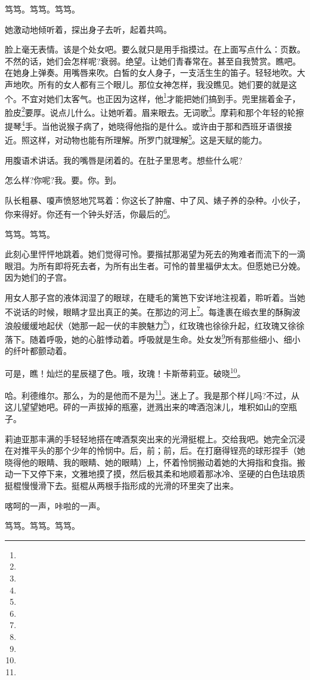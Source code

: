 \par 笃笃。笃笃。笃笃。
\par 她激动地倾听着，探出身子去听，起着共鸣。
\par 脸上毫无表情。该是个处女吧。要么就只是用手指摸过。在上面写点什么：页数。不然的话，她们会怎样呢?衰弱。绝望。让她们青春常在。甚至自我赞赏。瞧吧。在她身上弹奏。用嘴唇来吹。白皙的女人身子，一支活生生的笛子。轻轻地吹。大声地吹。所有的女人都有三个眼儿。那位女神怎样，我没瞧见。她们要的就是这个。不宜对她们太客气。也正因为这样，他\footnote{}才能把她们搞到手。兜里揣着金子，脸皮\footnote{}要厚。说点儿什么。让她听着。眉来眼去。无词歌\footnote{}。摩莉和那个年轻的轮擦提琴\footnote{}手。当他说猴子病了，她晓得他指的是什么。或许由于那和西班牙语很接近。照这样，对动物也能有所理解。所罗门就理解\footnote{}。这是天赋的能力。
\par 用腹语术讲话。我的嘴唇是闭着的。在肚子里思考。想些什么呢?
\par 怎么样?你呢?我。要。你。到。
\par 队长粗暴、嗄声愤怒地咒骂着：你这长了肿瘤、中了风、婊子养的杂种。小伙子，你来得好。你还有一个钟头好活，你最后的\footnote{}。
\par 笃笃。笃笃。
\par 此刻心里怦怦地跳着。她们觉得可怜。要揩拭那渴望为死去的殉难者而流下的一滴眼泪。为所有即将死去者，为所有出生者。可怜的普里福伊太太。但愿她已分娩。因为她们的子宫。
\par 用女人那子宫的液体润湿了的眼球，在睫毛的篱笆下安详地注视着，聆听着。当她不说话的时候，眼睛才显出真正的美。在那边的河上\footnote{}。每逢裹在缎衣里的酥胸波浪般缓缓地起伏（她那一起一伏的丰腴魅力\footnote{}），红玫瑰也徐徐升起，红玫瑰又徐徐落下。随着呼吸，她的心脏悸动着。呼吸就是生命。处女发\footnote{}所有那些细小、细小的纤叶都颤动着。
\par 可是，瞧！灿烂的星辰褪了色。哦，玫瑰！卡斯蒂莉亚。破晓\footnote{}。
\par 哈。利德维尔。那么，为的是他而不是为\footnote{}。迷上了。我是那个样儿吗?不过，从这儿望望她吧。砰的一声拔掉的瓶塞，迸溅出来的啤酒泡沫儿，堆积如山的空瓶子。
\par 莉迪亚那丰满的手轻轻地搭在啤酒泵突出来的光滑挺棍上。交给我吧。她完全沉浸在对推平头的那个少年的怜悯中。后，前；前，后。在打磨得锃亮的球形捏手（她晓得他的眼睛、我的眼睛、她的眼睛）上，怀着怜悯搬动着她的大拇指和食指。搬动一下又停下来，文雅地摸了摸，然后极其柔和地顺着那冰冷、坚硬的白色珐琅质挺棍慢慢滑下去。挺棍从两根手指形成的光滑的环里突了出来。
\par 喀呵的一声，咔啦的一声。
\par 笃笃。笃笃。笃笃。
